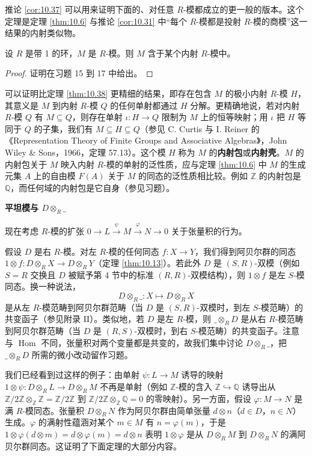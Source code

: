 推论 \ref{cor:10.37} 可以用来证明下面的、对任意 \(R\)-模都成立的更一般的版本。这个定理是定理 \ref{thm:10.6} 与推论 \ref{cor:10.31} 中“每个 \(R\)-模都是投射 \(R\)-模的商模”这一结果的内射类似物。

\begin{theorem}\label{thm:10.38}
设 \(R\) 是带 1 的环，\(M\) 是 \(R\)-模。则 \(M\) 含于某个内射 \(R\)-模中。
\end{theorem}

\begin{proof}
证明在习题 15 到 17 中给出。
\end{proof}

可以证明比定理 \ref{thm:10.38} 更精细的结果，即存在包含 \(M\) 的极小内射 \(R\)-模 \(H\)，其意义是 \(M\) 到内射 \(R\)-模 \(Q\) 的任何单射都通过 \(H\) 分解。更精确地说，若对内射 \(R\)-模 \(Q\) 有 \(M \subseteq Q\)，则存在单射 \(\iota : H \to Q\) 限制为 \(M\) 上的恒等映射；用 \(\iota\) 把 \(H\) 等同于 \(Q\) 的子集，我们有 \(M \subseteq H \subseteq Q\)（参见 C. Curtis 与 I. Reiner 的《Representation Theory of Finite Groups and Associative Algebras》，John Wiley \& Sons，1966，定理 57.13）。这个模 \(H\) 称为 \(M\) 的\textbf{内射包}或\textbf{内射壳}。\(M\) 的内射包关于 \(M\) 映入内射 \(R\)-模的单射的泛性质，应与定理 \ref{thm:10.6} 中 \(M\) 的生成元集 \(A\) 上的自由模 \(F(A)\) 关于 \(M\) 的同态的泛性质相比较。例如 \(\mathbb{Z}\) 的内射包是 \(\mathbb{Q}\)，而任何域的内射包是它自身（参见习题）。

\noindent\textbf{平坦模与 \(D \otimes_R \_\)}

现在考虑 \(R\)-模的扩张 \(0 \to L \xrightarrow{\psi} M \xrightarrow{\varphi} N \to 0\) 关于张量积的行为。

假设 \(D\) 是右 \(R\)-模。对左 \(R\)-模的任何同态 \(f : X \to Y\)，我们得到阿贝尔群的同态 \(1 \otimes f : D \otimes_R X \to D \otimes_R Y\)（定理 \ref{thm:10.13}）。若此外 \(D\) 是 \((S, R)\)-双模（例如 \(S = R\) 交换且 \(D\) 被赋予第 4 节中的标准 \((R, R)\)-双模结构），则 \(1 \otimes f\) 是左 \(S\)-模同态。换一种说法，
\[
D \otimes_R \_ : X \longmapsto D \otimes_R X
\]
是从左 \(R\)-模范畴到阿贝尔群范畴（当 \(D\) 是 \((S, R)\)-双模时，到左 \(S\)-模范畴）的共变函子（参见附录 II）。类似地，若 \(D\) 是左 \(R\)-模，则 \(\_ \otimes_R D\) 是从右 \(R\)-模范畴到阿贝尔群范畴（当 \(D\) 是 \((R, S)\)-双模时，到右 \(S\)-模范畴）的共变函子。注意与 \(\operatorname{Hom}\) 不同，张量积对两个变量都是共变的，故我们集中讨论 \(D \otimes_R \_\)，把 \(\_ \otimes_R D\) 所需的微小改动留作习题。

我们已经看到过这样的例子：由单射 \(\psi : L \to M\) 诱导的映射 \(1 \otimes \psi : D \otimes_R L \to D \otimes_R M\) 不再是单射（例如 \(\mathbb{Z}\)-模的含入 \(\mathbb{Z} \hookrightarrow \mathbb{Q}\) 诱导出从 \(\mathbb{Z}/2\mathbb{Z} \otimes_{\mathbb{Z}} \mathbb{Z} = \mathbb{Z}/2\mathbb{Z}\) 到 \(\mathbb{Z}/2\mathbb{Z} \otimes_{\mathbb{Z}} \mathbb{Q} = 0\) 的零映射）。另一方面，假设 \(\varphi : M \to N\) 是满 \(R\)-模同态。张量积 \(D \otimes_R N\) 作为阿贝尔群由简单张量 \(d \otimes n\)（\(d \in D\)，\(n \in N\)）生成。\(\varphi\) 的满射性蕴涵对某个 \(m \in M\) 有 \(n = \varphi(m)\)，于是 \(1 \otimes \varphi(d \otimes m) = d \otimes \varphi(m) = d \otimes n\) 表明 \(1 \otimes \varphi\) 是从 \(D \otimes_R M\) 到 \(D \otimes_R N\) 的满阿贝尔群同态。这证明了下面定理的大部分内容。

